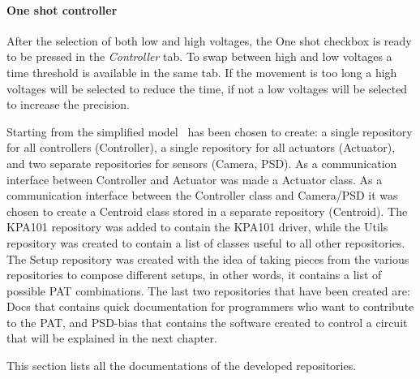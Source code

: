 \paragraph{One shot controller}

After the selection of both low and high voltages, the One shot checkbox is ready to be pressed in the \emph{Controller} tab. To
swap between high and low voltages a time threshold is available in the same tab. If the movement is too long a high voltages will be selected to reduce the time, if not a low voltages will be selected to increase the precision.

Starting from the simplified model~ has been chosen to create: a single repository for all controllers (Controller), a single repository for all actuators (Actuator), and two separate repositories for sensors (Camera, PSD).
As a communication interface between Controller and Actuator was made a Actuator class. As a communication interface between the Controller class and Camera/PSD it was chosen to create a Centroid class stored in a separate repository (Centroid).
The KPA101 repository was added to contain the KPA101 driver, while the Utils repository was created to contain a list of classes useful to all other repositories.
The Setup repository was created with the idea of taking pieces from the various repositories to compose different setups, in other words, it contains a list of possible PAT combinations.
The last two repositories that have been created are: Docs that contains quick documentation for programmers who want to contribute to the PAT, and PSD-bias that contains the software created to control a circuit that will be explained in the next chapter.

This section lists all the documentations of the developed repositories.

      {\parindent0pt
            
            
            
            
            
            
            
            
      }